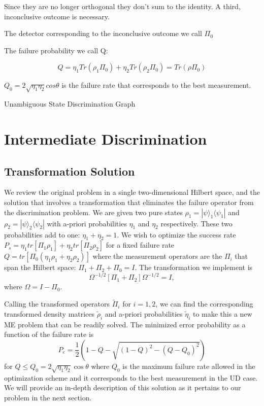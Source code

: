 \documentclass[12pt,oneside,english,reqno]{amsbook}
\numberwithin{section}{chapter}
\numberwithin{equation}{section}
\numberwithin{figure}{section}
\newcommand{\br}[1]{\langle #1|}
\newcommand{\ke}[1]{|#1\rangle}
\begin{document}
	Since they are no longer orthogonal they don't sum to the identity. A third, inconclusive outcome is necessary.

	The detector corresponding to the inconclusive outcome we call $\Pi_0$

	The failure probability we call Q:

\[Q =  \eta_1 Tr(\rho_1 \Pi_0) +\eta_2  Tr(\rho_2 \Pi_0) = Tr(\rho \Pi_0)\]

$ Q_0 = 2 \sqrt{\eta_1\eta_2} cos \theta$  is the failure rate that corresponds to the best measurement.

{Unambiguous State Discrimination Graph}

\section{Intermediate Discrimination}

\subsection{Transformation Solution}
We review the original problem in a single two-dimensional Hilbert space, and the solution that  involves a transformation that eliminates the failure operator from the discrimination problem.  We are given two pure states $\rho_1= \ke \psi_1 \br {\psi_1}$ and $\rho_2 = \ke \psi_2 \br{\psi_2}$ with a-priori probabilities $\eta_1$ and $\eta_2$ respectively.  These two probabilities add to one:  $\eta_1 +\eta_2 = 1$. We wish to optimize the success rate  $P_s = \eta_1tr[\Pi_1 \rho_1] + \eta_2 tr[\Pi_2 \rho_2]$ for a fixed failure rate $Q = tr[\Pi_0(\eta_1 \rho_1 + \eta_2 \rho_2)]$ where the measurement operators are the $\Pi_i$ that span the Hilbert space: $\Pi_1 + \Pi_2 + \Pi_0 = I$.  The transformation we implement is
 \begin{equation}
\Omega ^{-1/2}[\Pi_1 + \Pi_2] \Omega^{-1/2} = I,
\end{equation}
where $\Omega = I - \Pi_0$.

Calling the transformed operators $\widetilde \Pi_i$ for $i= 1,2$, we can find the corresponding transformed density matrices $\widetilde \rho_i$ and a-priori probabilities $
\widetilde \eta_i$ to make this a new ME problem that can be readily solved. The minimized error probability as a function of the failure rate is
\begin{equation} P_e = \frac{1}{2} (1 - Q -\sqrt{(1-Q)^2 - (Q-Q_0)^2})\end{equation}
for $Q \leq Q_0 = 2 \sqrt{\eta_1\eta_2} \cos \theta$ where $Q_0$ is the maximum failure rate allowed in the optimization scheme and it corresponds to the best measurement in the UD case.  We will provide an in-depth description of this solution as it pertains to our problem in the next section.
\end{document}
